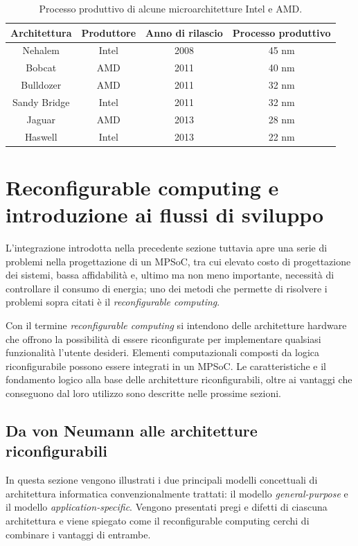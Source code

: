 \begin{table}[t]
  \begin{center}
    \begin{tabular}{|c|c|c|c|}
      \hline
      \textbf{Architettura} & \textbf{Produttore} & \textbf{Anno di rilascio} & \textbf{Processo produttivo}\\
      \hline
      Nehalem & Intel & 2008 & 45 nm\\
      \hline
      Bobcat & AMD & 2011 & 40 nm\\
      \hline
      Bulldozer & AMD & 2011 & 32 nm\\
      \hline
      Sandy Bridge & Intel & 2011 & 32 nm\\
      \hline
      Jaguar & AMD & 2013 & 28 nm\\
      \hline
      Haswell & Intel & 2013 & 22 nm\\
      \hline
    \end{tabular}
    \caption{Processo produttivo di alcune microarchitetture Intel
      \cite{IntelTransistor, IntelsVision} e AMD.}
    \label{tab:processoProduttivo}
  \end{center}
\end{table}



\section{Reconfigurable computing e introduzione ai flussi di sviluppo}
\label{sec:reconfComp}
L'integrazione introdotta nella precedente sezione tuttavia apre una serie di problemi nella progettazione
di un \ac{MPSoC}, tra cui elevato costo di progettazione dei sistemi, bassa affidabilità e, ultimo
ma non meno importante, necessità di controllare il consumo di energia; uno dei metodi che 
permette di risolvere i problemi sopra citati  \`e il \emph{reconfigurable computing}.

Con il termine \emph{reconfigurable computing} si intendono delle architetture hardware che 
offrono la possibilità di essere riconfigurate per implementare qualsiasi funzionalità 
l'utente desideri. Elementi computazionali composti da logica riconfigurabile possono essere integrati in un
\ac{MPSoC}. Le caratteristiche e il fondamento logico alla base delle architetture riconfigurabili,
oltre ai vantaggi che conseguono dal loro utilizzo sono descritte nelle prossime sezioni.

\subsection{Da von Neumann alle architetture riconfigurabili}
\label{subsec:cambioParadigma}
In questa sezione vengono illustrati i due principali modelli concettuali di architettura
informatica convenzionalmente trattati: il modello \emph{general-purpose} e il modello
\emph{application-specific}. Vengono presentati pregi e difetti di ciascuna architettura
e viene spiegato come il reconfigurable computing cerchi di combinare i vantaggi di
entrambe.

